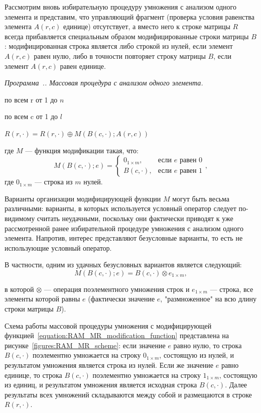 \documentclass[a4paper,12pt]{report}
\newcounter{programcounter}[chapter]
\renewcommand{\theprogramcounter}{\thechapter.\arabic{programcounter}}
\newenvironment{program}[1]
	{
		\medskip
		\refstepcounter{programcounter}
		\textit{Программа~\theprogramcounter. #1.}
		\ttfamily
		\begin{framed}
	}
	{
		\end{framed}
		\medskip
	}
\newcommand{\programline}[2]{\noindent \hspace{#1em} #2 \par}
\newcommand{\programlabel}[1]{\label{program:#1}}
\begin{document}
Рассмотрим вновь избирательную процедуру умножения с анализом одного элемента и представим, что управляющий фрагмент (проверка
условия равенства элемента $A(r,c)$ единице) отсутствует, а вместо него к строке матрицы $R$ всегда прибавляется
специальным образом модифицированные строки матрицы $B$: модифицированная строка является либо строкой из нулей, если элемент
$A(r,c)$ равен нулю, либо в точности повторяет строку матрицы $B$, если элемент $A(r,c)$ равен единице.

\begin{program}{Массовая процедура с анализом одного элемента}
	\programlabel{program:RAM_MR}
	\programline{1}{по всем r от 1 до $n$}
		\programline{2}{по всем c от 1 до $l$}
			\programline{3}{$R(r,\cdot) = R(r,\cdot) \oplus M ( B(c,\cdot); A(r,c) )$}
\end{program}

\noindent где $M$ --- функция модификации такая, что:
$$
M ( B(c,\cdot); e ) =
	\left \{
		\begin{array}{cc}
			0_{1 \times m}, & \text{если } e \text{ равен 0} \\
			B(c,\cdot), & \text{если } e \text{ равен 1}
		\end{array}
	\right .
,
$$
где $0_{1 \times m}$ --- строка из $m$ нулей.

Варианты организации модифицирующей функции $M$ могут быть весьма различными: варианты, в которых используется условный оператор
следует по-видимому считать неудачными, поскольку они фактически приводят к уже рассмотренной ранее избирательной процедуре
умножения с анализом одного элемента. Напротив, интерес представляют безусловные варианты, то есть не использующие условный
оператор.

В частности, одним из удачных безусловных вариантов является следующий:
\begin{equation}
	M ( B(c,\cdot); e ) = B(c,\cdot) \otimes e_{1 \times m},
	\label{equation:RAM_MR_modification_function}
\end{equation}

в которой $\otimes$ --- операция поэлементного умножения строк и $e_{1 \times m}$ --- строка,
все элементы которой равны $e$ (фактически значение $e$, "размноженное"{} на всю длину строки
матрицы $B$).

Схема работы массовой процедуры умножения с модифицирующей функцией~\ref{equation:RAM_MR_modification_function}
представлена на рисунке~\ref{figures:RAM_MR_scheme}: если значение $e$ равно
нулю, то строка $B(c,\cdot)$ поэлементно умножается на строку $0_{1 \times m}$, состоящую из нулей, и результатом
умножения является строка из нулей. Если же значение $e$ равно единице, то строка $B(c,\cdot)$ поэлементно умножается на
строку $1_{1 \times m}$, состоящую из единиц, и результатом умножения является исходная строка $B(c,\cdot)$. Далее
результаты всех умножений складываются между собой и размещаются в строке $R(r,\cdot)$. 
\end{document}
